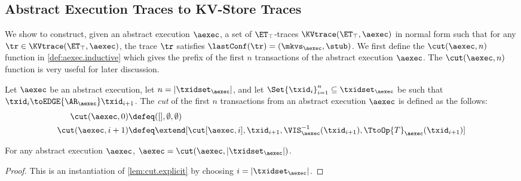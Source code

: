 \subsection{Abstract Execution Traces to KV-Store Traces}
\label{sec:aexectrace2kv}

We show to construct, given an abstract execution $\aexec$, 
a set of $\ET_{\top}$-traces $\KVtrace(\ET_{\top}, \aexec)$ in normal form such that for any 
$\tr \in \KVtrace(\ET_{\top}, \aexec)$, the trace \( \tr \) satisfies $\lastConf(\tr) = (\mkvs_{\aexec}, \stub)$. 
We first define the \( \cut(\aexec,n) \) function in \cref{def:aexec.inductive} 
which gives the prefix of the first \( n \) transactions of the abstract execution \( \aexec \).
The  \( \cut(\aexec,n) \) function is very useful for later discussion.

\begin{definition}
\label{def:aexec.inductive}
Let $\aexec$ be an abstract execution, let $n = \lvert \txidset_{\aexec} \rvert$, and let 
$\Set{\txid_{i}}_{i=1}^{n} \subseteq \txidset_{\aexec}$ be such that $\txid_{i} \toEDGE{\AR_{\aexec}} \txid_{i+1}$. 
The \emph{cut} of the first \( n \) transactions from an abstract execution \( \aexec \) is defined as the follows:
\begin{align*}
\cut(\aexec, 0) & \defeq ([], \emptyset, \emptyset)\\
\cut(\aexec , i+1) & \defeq \extend[\cut[\aexec, i], \txid_{i+1}, \VIS^{-1}_{\aexec}(\txid_{i+1}), \TtoOp{T}_{\aexec}(\txid_{i+1})]
\end{align*}
\end{definition}

\begin{proposition}
\label{prop:aexec.inductive}
For any abstract execution $\aexec$, $\aexec = \cut(\aexec, \lvert \txidset_{\aexec} \rvert)$.
\end{proposition}
\begin{proof}
    This is an instantiation of \cref{lem:cut.explicit} by choosing $i = \lvert \txidset_{\aexec} \rvert$. 
\end{proof}

